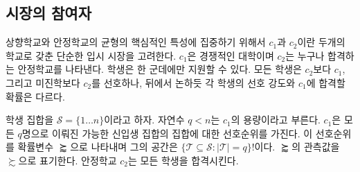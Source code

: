 \documentclass[12pt]{article} %
\newif\ifEN
\theoremstyle{definition}
\theoremstyle{definition}
\begin{document}
\ifEN {\subsection{Market participants}} \else {\subsection{시장의 참여자}} \fi
\ifEN {
To highlight the essential nature of the tradeoff between reach schools and safety schools, we consider a stylized admissions market with two schools, $c_1$ and $c_2$. $c_1$ is a competitive university, whereas $c_2$ represents the safety school, which admits any applicant. Students are allowed to apply to only one school. Every student prefers attending $c_1$ to $c_2$, and $c_2$ to nonattendance, but students differ in the strength of these preferences as well as in their admissions probabilities at $c_1$, as detailed below.%

Let $\mathcal{S} = \{1 \dots n\}$ denote the set of \emph{students}, and let the natural number $q < n$ denote $c_1$’s \emph{capacity}. $c_1$ has an ordinal preference order over the set of possible entering classes comprised of $q$ students. This preference order is a random variable $\succapprox$ whose space is $\{\mathcal{T}\subseteq \mathcal{S} : |\mathcal{T}| =q \}!$. Specific realizations of $\succapprox$ are denoted $\succsim$. The safety school, $c_2$, admits every applicant. 
} \else {
상향학교와 안정학교의 균형의 핵심적인 특성에 집중하기 위해서 $c_1$과 $c_2$이란 두개의 학교로 갖춘 단순한 입시 시장을 고려한다. $c_1$은 경쟁적인 대학이며 $c_2$는 누구나 합격하는 안정학교를 나타낸다. 학생은 한 군데에만 지원할 수 있다. 모든 학생은 $c_2$보다 $c_1$, 그리고 미진학보다 $c_2$를 선호하나, 뒤에서 논하듯 각 학생의 선호 강도와 $c_1$에 합격할 확률은 다르다.

학생 집합을 $\mathcal{S} = \{1 \dots n\}$이라고 하자. 자연수 $q < n$는 $c_1$의 용량이라고 부른다. $c_1$은 모든 $q$명으로 이뤄진 가능한 신입생 집합의 집합에 대한 선호순위를 가진다. 이 선호순위를 확률변수 $\succapprox$으로 나타내며 그의 공간은 $\{\mathcal{T}\subseteq \mathcal{S} : |\mathcal{T}| =q \}!$이다. $\succapprox$의 관측값을 $\succsim$으로 표기한다. 안정학교 $c_2$는 모든 학생을 합격시킨다. 
} \fi
\end{document}
